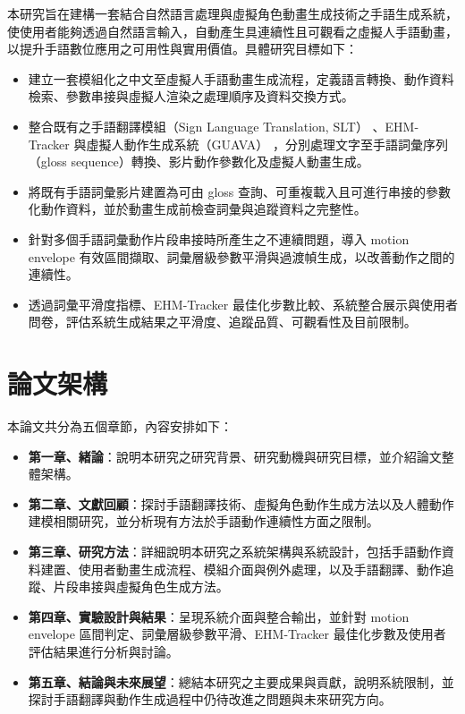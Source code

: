 \documentclass[class=NCU_thesis, crop=false]{standalone}
\begin{document}
本研究旨在建構一套結合自然語言處理與虛擬角色動畫生成技術之手語生成系統，使使用者能夠透過自然語言輸入，自動產生具連續性且可觀看之虛擬人手語動畫，以提升手語數位應用之可用性與實用價值。具體研究目標如下：

\begin{itemize}
    \item 建立一套模組化之中文至虛擬人手語動畫生成流程，定義語言轉換、動作資料檢索、參數串接與虛擬人渲染之處理順序及資料交換方式。
    
    \item 整合既有之手語翻譯模組（Sign Language Translation, SLT） \cite{Chu2025SLT}、EHM-Tracker 與虛擬人動作生成系統（GUAVA） \cite{zhang2025guava}，分別處理文字至手語詞彙序列（gloss sequence）轉換、影片動作參數化及虛擬人動畫生成。
    
    \item 將既有手語詞彙影片建置為可由 gloss 查詢、可重複載入且可進行串接的參數化動作資料，並於動畫生成前檢查詞彙與追蹤資料之完整性。
    
    \item 針對多個手語詞彙動作片段串接時所產生之不連續問題，導入 motion envelope 有效區間擷取、詞彙層級參數平滑與過渡幀生成，以改善動作之間的連續性。

    \item 透過詞彙平滑度指標、EHM-Tracker 最佳化步數比較、系統整合展示與使用者問卷，評估系統生成結果之平滑度、追蹤品質、可觀看性及目前限制。
\end{itemize}


\pagebreak



\section{論文架構}

本論文共分為五個章節，內容安排如下：

\begin{itemize}
\item \textbf{第一章、緒論}：說明本研究之研究背景、研究動機與研究目標，並介紹論文整體架構。

\item \textbf{第二章、文獻回顧}：探討手語翻譯技術、虛擬角色動作生成方法以及人體動作建模相關研究，並分析現有方法於手語動作連續性方面之限制。

\item \textbf{第三章、研究方法}：詳細說明本研究之系統架構與系統設計，包括手語動作資料建置、使用者動畫生成流程、模組介面與例外處理，以及手語翻譯、動作追蹤、片段串接與虛擬角色生成方法。

\item \textbf{第四章、實驗設計與結果}：呈現系統介面與整合輸出，並針對 motion envelope 區間判定、詞彙層級參數平滑、EHM-Tracker 最佳化步數及使用者評估結果進行分析與討論。

\item \textbf{第五章、結論與未來展望}：總結本研究之主要成果與貢獻，說明系統限制，並探討手語翻譯與動作生成過程中仍待改進之問題與未來研究方向。
\end{itemize}

\pagebreak
\end{document}
